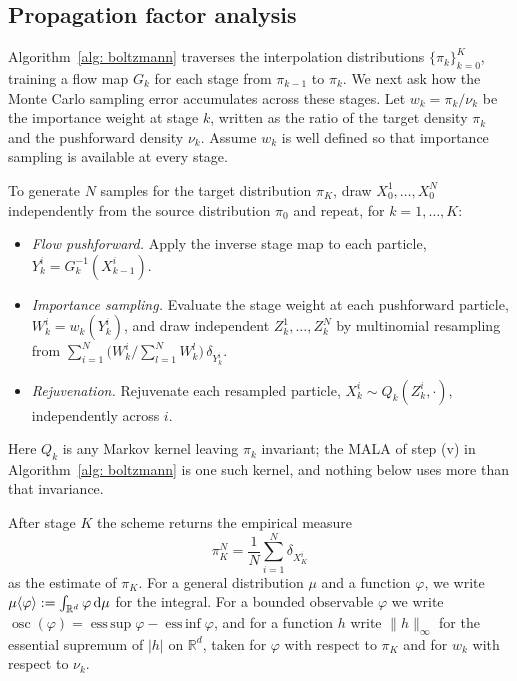 \documentclass{article}
\begin{document}
\subsection{Propagation factor analysis}
\label{sec: propagation-analysis}

Algorithm~\ref{alg: boltzmann} traverses the interpolation distributions $\{\pi_k\}_{k=0}^K$, training a flow map $G_k$ for each stage from $\pi_{k-1}$ to $\pi_k$. We next ask how the Monte Carlo sampling error accumulates across these stages. {\color{blue}Let $w_k = \pi_k/\nu_k$ be the importance weight at stage $k$, written as the ratio of the target density $\pi_k$ and the pushforward density $\nu_k$. Assume $w_k$ is well defined so that importance sampling is available at every stage.}

To generate $N$ samples for the target distribution $\pi_K$, draw $X_0^1,\dots,X_0^N$ independently from the source distribution $\pi_0$ and repeat, for $k=1,\dots,K$:
\begin{itemize}
	\setlength{\itemsep}{0pt}
	\item \emph{{\color{purple}Flow pushforward}.} Apply the inverse stage map to each particle, $Y_k^i = G_k^{-1}(X_{k-1}^i)$.
	\item \emph{{\color{purple}Importance sampling}.} Evaluate the stage weight at each {\color{purple}pushforward} particle, $W_k^i = w_k(Y_k^i)$, {\color{purple}and draw independent $Z_k^1,\dots,Z_k^N$ by multinomial resampling from $\sum_{i=1}^{N}\bigl(W_k^i/\sum_{l=1}^{N} W_k^l\bigr)\,\delta_{Y_k^i}$}.
	\item {\color{purple}\emph{Rejuvenation.} Rejuvenate each resampled particle, $X_k^i \sim Q_k(Z_k^i,\cdot)$, independently across $i$.}
\end{itemize}
{\color{purple}Here $Q_k$ is any Markov kernel leaving $\pi_k$ invariant; the MALA of step (v) in Algorithm~\ref{alg: boltzmann} is one such kernel, and nothing below uses more than that invariance.}

After stage $K$ the scheme returns the empirical measure
\begin{equation}
	\pi_K^N = \frac1N\sum_{i=1}^{N} \delta_{X_K^i}
\end{equation}
as the estimate of $\pi_K$. For a general distribution $\mu$ and a function $\varphi$, we write $\mu\langle \varphi\rangle := \int_{\mathbb R^d} \varphi \, \mathrm{d}\mu$ {\color{purple}for} the integral. For a bounded observable $\varphi$ we write $\operatorname{osc}(\varphi) = \operatorname{ess\,sup}\varphi - \operatorname{ess\,inf}\varphi$, and for a function $h$ write $\lVert h \rVert_\infty$ for {\color{purple}the essential supremum of $|h|$} on $\mathbb R^d$, taken {\color{blue}for $\varphi$ with respect to $\pi_K$ and} for $w_k$ with respect to $\nu_k$.
\end{document}
